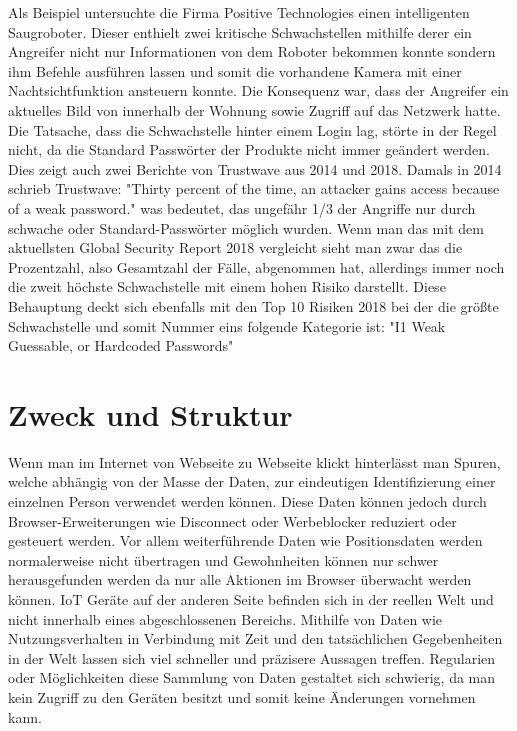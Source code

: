 Als Beispiel untersuchte die Firma Positive Technologies einen intelligenten Saugroboter.
Dieser enthielt zwei kritische Schwachstellen mithilfe derer ein Angreifer nicht nur Informationen von dem Roboter bekommen konnte sondern ihm Befehle ausführen lassen und somit die vorhandene Kamera mit einer Nachtsichtfunktion ansteuern konnte. Die Konsequenz war, dass der Angreifer ein aktuelles Bild von innerhalb der Wohnung sowie Zugriff auf das Netzwerk hatte. Die Tatsache, dass die Schwachstelle hinter einem Login lag, störte in der Regel nicht, da die Standard Passwörter der Produkte nicht immer geändert werden.
Dies zeigt auch zwei Berichte von Trustwave aus 2014 und 2018.
Damals in 2014 schrieb Trustwave: "Thirty percent of the time, an attacker gains access because of a weak password."
was bedeutet, das ungefähr 1/3 der Angriffe nur durch schwache oder Standard-Passwörter möglich wurden. Wenn man das mit dem aktuellsten Global Security Report 2018 vergleicht sieht man zwar das die Prozentzahl, also Gesamtzahl der Fälle, abgenommen hat, allerdings immer noch die zweit höchste Schwachstelle mit einem hohen Risiko darstellt.
Diese Behauptung deckt sich ebenfalls mit den Top 10 Risiken 2018 bei der die größte Schwachstelle und somit Nummer eins folgende Kategorie ist: "I1 Weak Guessable, or Hardcoded Passwords" %


\section{Zweck und Struktur}
    Wenn man im Internet von Webseite zu Webseite klickt hinterlässt man Spuren, welche abhängig von der Masse der Daten, zur eindeutigen Identifizierung einer einzelnen Person verwendet werden können. %
    Diese Daten können jedoch durch Browser-Erweiterungen wie Disconnect oder Werbeblocker reduziert oder gesteuert werden. Vor allem weiterführende Daten wie Positionsdaten werden normalerweise nicht übertragen und Gewohnheiten können nur schwer herausgefunden werden da nur alle Aktionen im Browser überwacht werden können.
    \ac{IoT} Geräte auf der anderen Seite befinden sich in der reellen Welt und nicht innerhalb eines abgeschlossenen Bereichs. Mithilfe von Daten wie Nutzungsverhalten in Verbindung mit Zeit und den tatsächlichen Gegebenheiten in der Welt lassen sich viel schneller und präzisere Aussagen treffen. Regularien oder Möglichkeiten diese Sammlung von Daten gestaltet sich schwierig, da man kein Zugriff zu den Geräten besitzt und somit keine Änderungen vornehmen kann.
    

